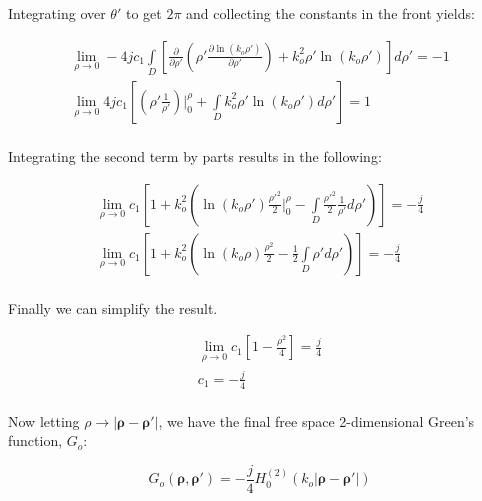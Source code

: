 \noindent Integrating over $\theta'$ to get $2\pi$ and collecting the constants in the front yields:

\begin{equation}
\begin{gathered}
\lim_{\rho\to 0}-4jc_1\int\limits_{D} \left[\frac{\partial}{\partial \rho'}\left(\rho' \frac{\partial \ln(k_o\rho')}{\partial \rho'} \right) + k_o^2\rho'\ln(k_o\rho')\right] d\rho' = -1 \\
\lim_{\rho\to 0}4jc_1\left[\left(\rho' \frac{1 }{\rho'} \right)\bigg|_0^{\rho} + \int\limits_{D}k_o^2\rho'\ln(k_o\rho') d\rho'\right] = 1 \\
\end{gathered}
\label{gf_eq:39a}
\end{equation}
\renewcommand{\baselinestretch}{2} \small\normalsize

\noindent Integrating the second term by parts results in the following:

\begin{equation}
\begin{gathered}
\lim_{\rho\to 0}c_1\left[ 1 +  k_o^2\left( \ln(k_o\rho')\frac{\rho'^2}{2}\bigg|_0^{\rho} - \int\limits_{D}\frac{\rho'^2}{2}\frac{1}{\rho'} d\rho' \right)\right] = -\frac{j}{4} \\
\lim_{\rho\to 0}c_1\left[ 1 +  k_o^2\left( \ln(k_o\rho)\frac{\rho^2}{2} - \frac{1}{2}\int\limits_{D}\rho' d\rho' \right)\right] = -\frac{j}{4} \\
\end{gathered}
\label{gf_eq:39c}
\end{equation}
\renewcommand{\baselinestretch}{2} \small\normalsize

\noindent Finally we can simplify the result.

\begin{equation}
\begin{gathered}
\lim_{\rho\to 0}c_1\left[ 1 - \frac{\rho^2}{4}\right] = \frac{j}{4} \\
c_1 = -\frac{j}{4}\\
\end{gathered}
\label{gf_eq:39d}
\end{equation}
\renewcommand{\baselinestretch}{2} \small\normalsize

Now letting $\rho \rightarrow |\boldsymbol{\rho}-\boldsymbol{\rho}'|$, we have the final free space 2-dimensional Green's function, $G_o$:

\begin{equation}
\boxed{G_o\left(\boldsymbol{\rho},\boldsymbol{\rho}'\right) = -\frac{j}{4}H_0^{(2)}\left(k_o|\boldsymbol{\rho} - \boldsymbol{\rho}' | \right)}
\label{gf_eq:40}
\end{equation}
\renewcommand{\baselinestretch}{2} \small\normalsize

